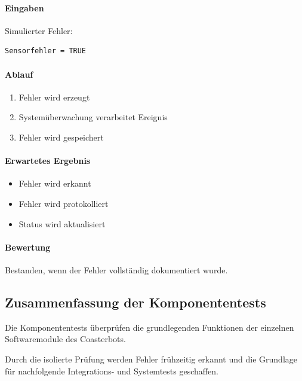 \documentclass[
  a4paper,
  12pt,
  DIV=12,        %
  parskip=half,  %
  headings=small %
]{scrartcl}
\theoremstyle{definition}
\providecommand{\tightlist}{%
  \setlength{\itemsep}{0pt}\setlength{\parskip}{0pt}}
\theoremstyle{definition}
\begin{document}
\paragraph{Eingaben}\label{eingaben-8}

Simulierter Fehler:

\begin{verbatim}
Sensorfehler = TRUE
\end{verbatim}

\paragraph{Ablauf}\label{ablauf-8}

\begin{enumerate}
\def\labelenumi{\arabic{enumi}.}
\tightlist
\item
  Fehler wird erzeugt
\item
  Systemüberwachung verarbeitet Ereignis
\item
  Fehler wird gespeichert
\end{enumerate}

\paragraph{Erwartetes Ergebnis}\label{erwartetes-ergebnis-8}

\begin{itemize}
\tightlist
\item
  Fehler wird erkannt
\item
  Fehler wird protokolliert
\item
  Status wird aktualisiert
\end{itemize}

\paragraph{Bewertung}\label{bewertung-8}

Bestanden, wenn der Fehler vollständig dokumentiert wurde.

\subsection{Zusammenfassung der
Komponententests}\label{zusammenfassung-der-komponententests}

Die Komponententests überprüfen die grundlegenden Funktionen der
einzelnen Softwaremodule des Coasterbots.

Durch die isolierte Prüfung werden Fehler frühzeitig erkannt und die
Grundlage für nachfolgende Integrations- und Systemtests geschaffen.
\end{document}
